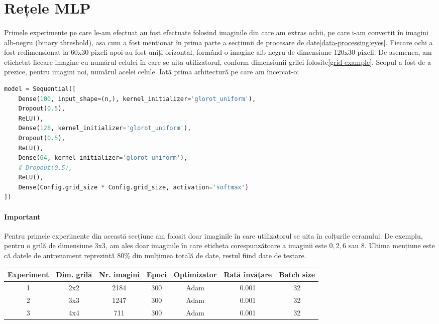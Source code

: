 \section{Rețele MLP}
\paragraph{}
Primele experimente pe care le-am efectuat au fost efectuate folosind imaginile din care am extras ochii, pe care i-am convertit în imagini alb-negru (binary threshold), așa cum a fost menționat în prima parte a secțiunii de procesare de date\ref{data-processing:eyes}.
Fiecare ochi a fost redimensionat la 60x30 pixeli apoi au fost uniți orizontal, formând o imagine alb-negru de dimensiune 120x30 pixeli.
De asemenea, am etichetat fiecare imagine cu numărul celulei în care se uita utilizatorul, conform dimensiunii grilei folosite\ref{grid-example}.
Scopul a fost de a prezice, pentru imagini noi, numărul acelei celule.
Iată prima arhitectură pe care am încercat-o:

\begin{lstlisting}[language=Python, caption=MLP 1]
model = Sequential([
    Dense(100, input_shape=(n,), kernel_initializer='glorot_uniform'),
    Dropout(0.5),
    ReLU(),
    Dense(128, kernel_initializer='glorot_uniform'),
    Dropout(0.5),
    ReLU(),
    Dense(64, kernel_initializer='glorot_uniform'),
    # Dropout(0.5),
    ReLU(),
    Dense(Config.grid_size * Config.grid_size, activation='softmax')
])
\end{lstlisting}

\paragraph{Important}
Pentru primele experimente din această secțiune am folosit doar imaginile în care utilizatorul se uita în colțurile ecranului.
De exemplu, pentru o grilă de dimensiune 3x3, am ales doar imaginile în care eticheta corespunzătoare a imaginii este $0, 2, 6$ sau $8$.
Ultima mențiune este că datele de antrenament reprezintă $80\%$ din mulțimea totală de date, restul fiind date de testare.

\begin{center}
    \begin{tabular}{ c | c | c | c | c | c | c }
        \hline
        Experiment & Dim. grilă & Nr. imagini & Epoci & Optimizator & Rată învățare & Batch size \\ 
        \hline
        1 & 2x2 & 2184 & 300 & Adam & 0.001 & 32 \\
        \hline
        2 & 3x3 & 1247 & 300 & Adam & 0.001 & 32 \\
        \hline
        3 & 4x4 & 711 & 300 & Adam & 0.001 & 32 \\
        \hline
    \end{tabular}
\end{center}

